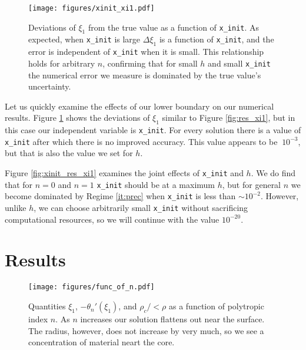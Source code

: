\documentclass[twocolumn]{aastex631}
\begin{document}
\begin{figure}
    \begin{centering}
        \texttt{[image: figures/xinit\_xi1.pdf]}
        \caption{Deviations of $\xi_1$ from the true value as a
        function of \texttt{x\_init}. As expected, when \texttt{x\_init}
        is large $\Delta \xi_1$ is a function of \texttt{x\_init},
        and the error is independent of \texttt{x\_init} when it is small.
        This relationship holds for arbitrary $n$, confirming that
        for small $h$ and small \texttt{x\_init} the numerical
        error we measure is dominated by the true value's uncertainty.}
        \label{fig:xinit_xi1}
    \end{centering}
\end{figure}

Let us quickly examine the effects of our lower boundary on our
numerical results. Figure \ref{fig:xinit_xi1} shows the
deviations of $\xi_1$ similar to Figure \ref{fig:res_xi1},
but in this case our independent variable is \texttt{x\_init}.
For every solution there is a value of \texttt{x\_init}
after which there is no improved accuracy. This value appears to be
$~10^{-3}$, but that is also the value we set for $h$.

Figure \ref{fig:xinit_res_xi1} examines the joint effects of 
\texttt{x\_init} and $h$. We do find that for $n=0$ and $n=1$
\texttt{x\_init} should be at a maximum $h$, but for general $n$
we become dominated by Regime \ref{it:prec} when \texttt{x\_init}
is less than $\sim 10^{-2}$. However, unlike $h$, we can choose arbitrarily
small \texttt{x\_init} without sacrificing computational
resources, so we will continue with the value $10^{-20}$.

\section{Results}
\label{sec:results}


\begin{figure}
    \begin{centering}
        \texttt{[image: figures/func\_of\_n.pdf]}
        \caption{Quantities $\xi_1$, $-\theta_n'(\xi_1)$,
        and $\rho_c/<\rho$ as a function of polytropic index $n$.
        As $n$ increases our solution flattens out near the surface.
        The radius, however, does not increase by very much, so
        we see a concentration of material neart the core.}
        \label{fig:func_of_n}
    \end{centering}
\end{figure}
\end{document}
